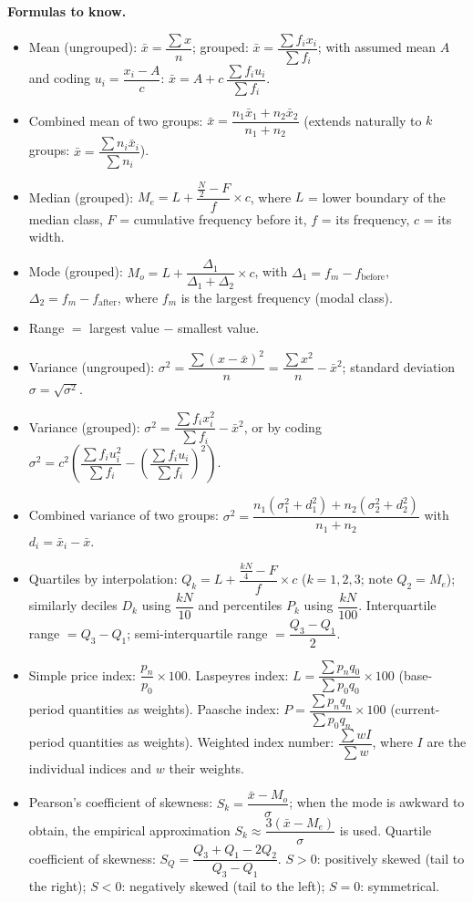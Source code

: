 \documentclass[11pt]{article}
\newcommand{\cle}[1]{{\popxbold\color{popdark}#1}}
\begin{document}
\begin{bilan}
\textbf{Formulas to know.}
\begin{itemize}
\item Mean (ungrouped): $\bar{x}=\dfrac{\sum x}{n}$; grouped: $\bar{x}=\dfrac{\sum f_i x_i}{\sum f_i}$; with assumed mean $A$ and coding $u_i=\dfrac{x_i-A}{c}$: $\bar{x}=A+c\,\dfrac{\sum f_i u_i}{\sum f_i}$.
\item \cle{Combined mean} of two groups: $\bar{x}=\dfrac{n_1\bar{x}_1+n_2\bar{x}_2}{n_1+n_2}$ (extends naturally to $k$ groups: $\bar{x}=\dfrac{\sum n_i\bar{x}_i}{\sum n_i}$).
\item Median (grouped): $M_e=L+\dfrac{\frac{N}{2}-F}{f}\times c$, where $L$ = lower boundary of the median class, $F$ = cumulative frequency before it, $f$ = its frequency, $c$ = its width.
\item Mode (grouped): $M_o=L+\dfrac{\Delta_1}{\Delta_1+\Delta_2}\times c$, with $\Delta_1=f_m-f_{\text{before}}$, $\Delta_2=f_m-f_{\text{after}}$, where $f_m$ is the largest frequency (modal class).
\item \cle{Range} $=$ largest value $-$ smallest value.
\item Variance (ungrouped): $\sigma^2=\dfrac{\sum(x-\bar{x})^2}{n}=\dfrac{\sum x^2}{n}-\bar{x}^2$; standard deviation $\sigma=\sqrt{\sigma^2}$.
\item Variance (grouped): $\sigma^2=\dfrac{\sum f_i x_i^2}{\sum f_i}-\bar{x}^2$, or by coding $\sigma^2=c^2\left(\dfrac{\sum f_i u_i^2}{\sum f_i}-\left(\dfrac{\sum f_i u_i}{\sum f_i}\right)^2\right)$.
\item Combined variance of two groups: $\sigma^2=\dfrac{n_1(\sigma_1^2+d_1^2)+n_2(\sigma_2^2+d_2^2)}{n_1+n_2}$ with $d_i=\bar{x}_i-\bar{x}$.
\item Quartiles by interpolation: $Q_k=L+\dfrac{\frac{kN}{4}-F}{f}\times c$ ($k=1,2,3$; note $Q_2=M_e$); similarly deciles $D_k$ using $\dfrac{kN}{10}$ and percentiles $P_k$ using $\dfrac{kN}{100}$. \cle{Interquartile range} $=Q_3-Q_1$; \cle{semi-interquartile range} $=\dfrac{Q_3-Q_1}{2}$.
\item Simple price index: $\dfrac{p_n}{p_0}\times 100$. \cle{Laspeyres index}: $L=\dfrac{\sum p_n q_0}{\sum p_0 q_0}\times 100$ (base-period quantities as weights). \cle{Paasche index}: $P=\dfrac{\sum p_n q_n}{\sum p_0 q_n}\times 100$ (current-period quantities as weights). Weighted index number: $\dfrac{\sum wI}{\sum w}$, where $I$ are the individual indices and $w$ their weights.
\item \cle{Pearson's coefficient of skewness}: $S_k=\dfrac{\bar{x}-M_o}{\sigma}$; when the mode is awkward to obtain, the empirical approximation $S_k\approx\dfrac{3(\bar{x}-M_e)}{\sigma}$ is used. \cle{Quartile coefficient of skewness}: $S_Q=\dfrac{Q_3+Q_1-2Q_2}{Q_3-Q_1}$. $S>0$: positively skewed (tail to the right); $S<0$: negatively skewed (tail to the left); $S=0$: symmetrical.
\end{itemize}


\end{bilan}
\end{document}
